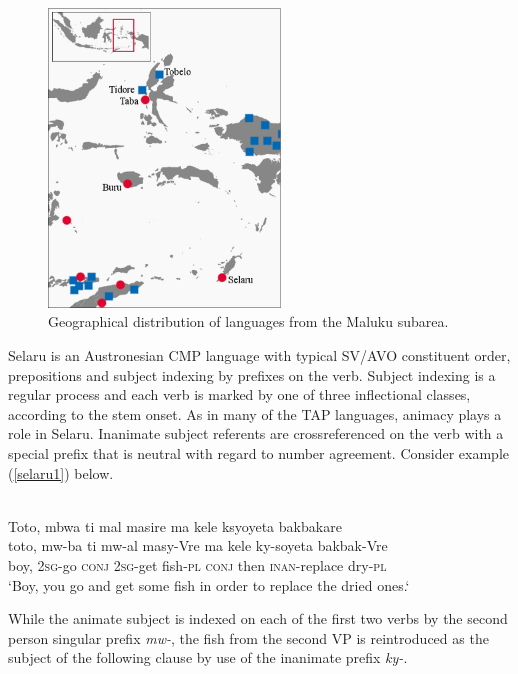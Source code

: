 \begin{figure}

\includegraphics[width=0.55\textwidth]{figures/Map_Maluku2.eps}
\caption{Geographical distribution of languages from the Maluku subarea.}\label{map:Mal}

\end{figure}

Selaru is an Austronesian CMP language with typical SV/AVO constituent order, prepositions and subject indexing by prefixes on the verb. Subject indexing is a regular process and each verb is marked by one of three inflectional classes, according to the stem onset. As in many of the TAP languages, animacy plays a role in Selaru. Inanimate subject referents are crossreferenced on the verb with a special prefix that is neutral with regard to number agreement. Consider example (\ref{selaru1}) below.

\ea \label{selaru1}
\\
\glll Toto, mbwa ti mal masire ma kele ksyoyeta bakbakare\\
toto, mw-ba ti mw-al masy-Vre ma kele ky-soyeta bakbak-Vre\\
boy, \textsc{2}\textsc{sg}-go \textsc{conj} \textsc{2}\textsc{sg}-get fish-\textsc{pl} \textsc{conj} then \textsc{inan}-replace dry-\textsc{pl} \\
\glft `Boy, you go and get some fish in order to replace the dried ones.‘
\z

While the animate subject is indexed on each of the first two verbs by the second person singular prefix \textit{mw-}, the fish from the second VP is reintroduced as the subject of the following clause by use of the inanimate prefix \textit{ky-}. 


